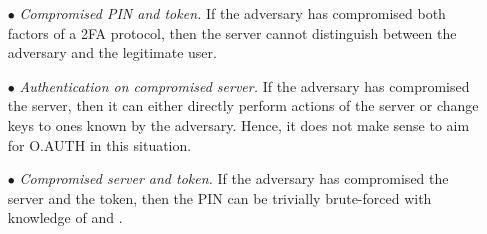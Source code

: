 \begin{itemize}[leftmargin=3.5mm]
\item[$\bullet$]\textit{Compromised PIN and token.}
If the adversary has compromised both factors of a 2FA protocol, then the server cannot distinguish between the adversary and the legitimate user.

\item[$\bullet$]\textit{Authentication on compromised server.}
If the adversary has compromised the server, then it can either directly perform actions of the server or change keys to ones known by the adversary. Hence, it does not make sense to aim for O.AUTH in this situation.

\item[$\bullet$]\textit{Compromised server and token.}
If the adversary has compromised the server and the token, then the PIN can be trivially brute-forced with knowledge of \VS{\verifier} and \VC{\salt}. %
\end{itemize}

